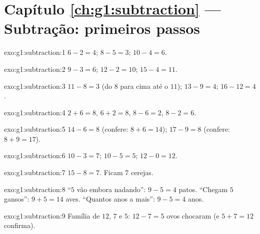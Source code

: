 \section*{Capítulo \ref{ch:g1:subtraction} --- Subtração: primeiros passos}

\begin{solution}{exo:g1:subtraction:1}
$6 - 2 = 4$; \quad $8 - 5 = 3$; \quad $10 - 4 = 6$.
\end{solution}

\begin{solution}{exo:g1:subtraction:2}
$9 - 3 = 6$; \quad $12 - 2 = 10$; \quad $15 - 4 = 11$.
\end{solution}

\begin{solution}{exo:g1:subtraction:3}
$11 - 8 = 3$ (do $8$ para cima até o $11$); \quad
$13 - 9 = 4$; \quad $16 - 12 = 4$.
\end{solution}

\begin{solution}{exo:g1:subtraction:4}
$2 + 6 = 8$, \quad $6 + 2 = 8$, \quad $8 - 6 = 2$, \quad
$8 - 2 = 6$.
\end{solution}

\begin{solution}{exo:g1:subtraction:5}
$14 - 6 = 8$ (confere: $8 + 6 = 14$); \quad
$17 - 9 = 8$ (confere: $8 + 9 = 17$).
\end{solution}

\begin{solution}{exo:g1:subtraction:6}
$10 - 3 = 7$; \quad $10 - 5 = 5$; \quad $12 - 0 = 12$.
\end{solution}

\begin{solution}{exo:g1:subtraction:7}
$15 - 8 = 7$. Ficam $7$ cerejas.
\end{solution}

\begin{solution}{exo:g1:subtraction:8}
``$5$ vão embora nadando'': $9 - 5 = 4$ patos. ``Chegam $5$
gansos'': $9 + 5 = 14$ aves. ``Quantos anos a mais'':
$9 - 5 = 4$ anos.
\end{solution}

\begin{solution}{exo:g1:subtraction:9}
Família de $12$, $7$ e $5$: $12 - 7 = 5$ ovos chocaram (e
$5 + 7 = 12$ confirma).
\end{solution}
